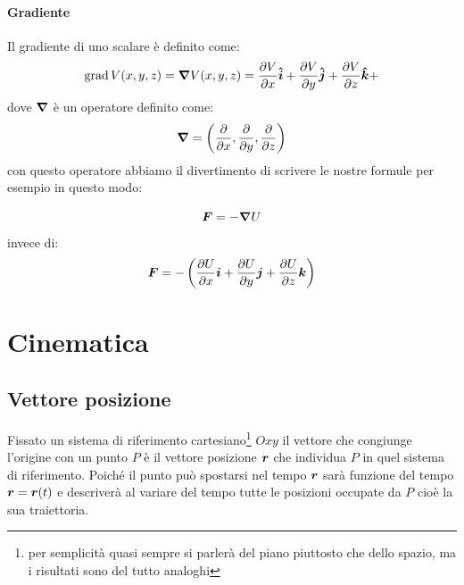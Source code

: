 \subsubsection{Gradiente}
\label{gradiente}
Il gradiente di uno scalare è definito come:
\begin{equation*}
\operatorname{grad} V(x,y,z)=\boldsymbol{\nabla} V(x,y,z)=\frac{\partial V}{\partial x}\boldsymbol{\hat {i}} + \frac{\partial V}{\partial y}\boldsymbol{\hat {j}} +\frac{\partial V}{\partial z}\boldsymbol{\hat {k}} +
\end{equation*}
dove $\boldsymbol{\nabla}$ è un operatore definito come:
\begin{equation*}
\boldsymbol{\nabla}=\left(\frac{\partial}{\partial x},\frac{\partial}{\partial y},\frac{\partial }{\partial z}\right)
\end{equation*}
con questo operatore abbiamo il divertimento di scrivere le nostre formule per esempio in questo modo:

\begin{equation*}
\boldsymbol{F}=-\boldsymbol{\nabla} U
\end{equation*}
invece di:
\begin{equation*}
\boldsymbol{F}=-\left(\frac{\partial U}{\partial
x}\boldsymbol{i}+\frac{\partial U}{\partial y}\boldsymbol{j}+\frac{\partial
U}{\partial z}\boldsymbol{k}\right)
\end{equation*}

\chapter{Cinematica}
\minitoc
\section{Vettore posizione}
Fissato un sistema di riferimento cartesiano\footnote{per semplicità quasi sempre si parlerà del piano piuttosto che dello spazio, ma i risultati sono del tutto analoghi} $Oxy$ il vettore che congiunge l'origine con un punto $P$ è il vettore posizione $\boldsymbol{r}$ che individua $P$ in quel sistema di riferimento. Poiché il punto può spostarsi nel tempo $\boldsymbol{r}$ sarà funzione del tempo $\boldsymbol{r}=\boldsymbol{r}(t)$ e descriverà al variare del tempo tutte le posizioni occupate da $P$ cioè la sua traiettoria.

